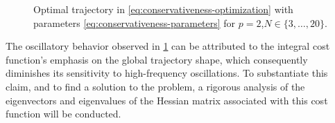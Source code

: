 

\begin{figure}
        
        \caption{Optimal trajectory in \cref{eq:conservativeness-optimization} with parameters \cref{eq:conservativeness-parameters} for $p=2$,$N\in\{3,\ldots,20\}$.}
        \label{fig:conservativeness-traj-integral}
\end{figure}

The oscillatory behavior observed in \cref{fig:conservativeness-traj-integral} can be attributed to the integral cost function's emphasis on the global trajectory shape, which consequently diminishes its sensitivity to high-frequency oscillations. To substantiate this claim, and to find a solution to the problem, a rigorous analysis of the eigenvectors and eigenvalues of the Hessian matrix associated with this cost function will be conducted.

